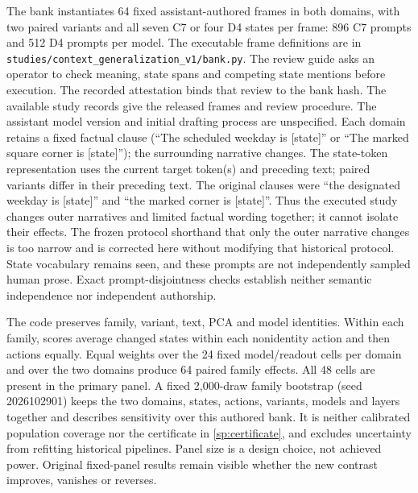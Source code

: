 The bank instantiates 64 fixed assistant-authored frames in both domains, with two paired variants and all seven C7 or four D4 states per frame: 896 C7 prompts and 512 D4 prompts per model. The executable frame definitions are in \texttt{studies/context\_generalization\_v1/bank.py}. The review guide asks an operator to check meaning, state spans and competing state mentions before execution. The recorded attestation binds that review to the bank hash. The available study records give the released frames and review procedure. The assistant model version and initial drafting process are unspecified. Each domain retains a fixed factual clause (``The scheduled weekday is [state]'' or ``The marked square corner is [state]''); the surrounding narrative changes. The state-token representation uses the current target token(s) and preceding text; paired variants differ in their preceding text. The original clauses were ``the designated weekday is [state]'' and ``the marked corner is [state]''. Thus the executed study changes outer narratives and limited factual wording together; it cannot isolate their effects. The frozen protocol shorthand that only the outer narrative changes is too narrow and is corrected here without modifying that historical protocol. State vocabulary remains seen, and these prompts are not independently sampled human prose. Exact prompt-disjointness checks establish neither semantic independence nor independent authorship.

The code preserves family, variant, text, PCA and model identities. Within each family, scores average changed states within each nonidentity action and then actions equally. Equal weights over the 24 fixed model/readout cells per domain and over the two domains produce 64 paired family effects. All 48 cells are present in the primary panel. A fixed 2,000-draw family bootstrap (seed 2026102901) keeps the two domains, states, actions, variants, models and layers together and describes sensitivity over this authored bank. It is neither calibrated population coverage nor the certificate in \cref{sp:certificate}, and excludes uncertainty from refitting historical pipelines. Panel size is a design choice, not achieved power. Original fixed-panel results remain visible whether the new contrast improves, vanishes or reverses.

